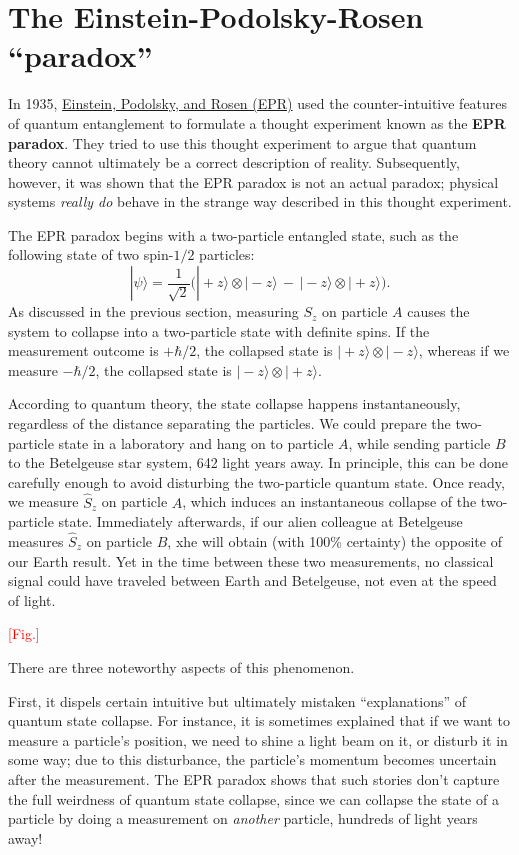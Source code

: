 \documentclass[pra,11pt]{revtex4}
\begin{document}
\section{The Einstein-Podolsky-Rosen ``paradox''}

In 1935, \hyperref[cite:epr]{Einstein, Podolsky, and Rosen (EPR)} used
the counter-intuitive features of quantum entanglement to formulate a
thought experiment known as the \textbf{EPR paradox}.  They tried to
use this thought experiment to argue that quantum theory cannot
ultimately be a correct description of reality.  Subsequently,
however, it was shown that the EPR paradox is not an actual paradox;
physical systems \textit{really do} behave in the strange way
described in this thought experiment.

The EPR paradox begins with a two-particle entangled state, such as
the following state of two spin-$1/2$ particles:
$$|\psi\rangle = \frac{1}{\sqrt{2}} \Big(|\!+\!z\rangle\otimes|\!-\!z\rangle \,-\, |\!-\!z\rangle\otimes|\!+\!z\rangle\Big).$$
As discussed in the previous section, measuring $S_z$ on particle $A$
causes the system to collapse into a two-particle state with definite
spins.  If the measurement outcome is $+\hbar/2$, the collapsed state
is $|\!+\!z\rangle \otimes|\!-\!z\rangle$, whereas if we measure
$-\hbar/2$, the collapsed state is
$|\!-\!z\rangle\otimes|\!+\!z\rangle$.

According to quantum theory, the state collapse happens
instantaneously, regardless of the distance separating the particles.
We could prepare the two-particle state in a laboratory and hang on to
particle $A$, while sending particle $B$ to the Betelgeuse star
system, 642 light years away.  In principle, this can be done
carefully enough to avoid disturbing the two-particle quantum state.
Once ready, we measure $\hat{S}_z$ on particle $A$, which induces an
instantaneous collapse of the two-particle state.  Immediately
afterwards, if our alien colleague at Betelgeuse measures $\hat{S}_z$
on particle $B$, xhe will obtain (with 100\% certainty) the opposite
of our Earth result.  Yet in the time between these two measurements,
no classical signal could have traveled between Earth and Betelgeuse,
not even at the speed of light.

\textcolor{red}{[Fig.]}

There are three noteworthy aspects of this phenomenon.

First, it dispels certain intuitive but ultimately mistaken
``explanations'' of quantum state collapse.  For instance, it is
sometimes explained that if we want to measure a particle's position,
we need to shine a light beam on it, or disturb it in some way; due to
this disturbance, the particle's momentum becomes uncertain after the
measurement.  The EPR paradox shows that such stories don't capture
the full weirdness of quantum state collapse, since we can collapse
the state of a particle by doing a measurement on \textit{another}
particle, hundreds of light years away!
\end{document}
